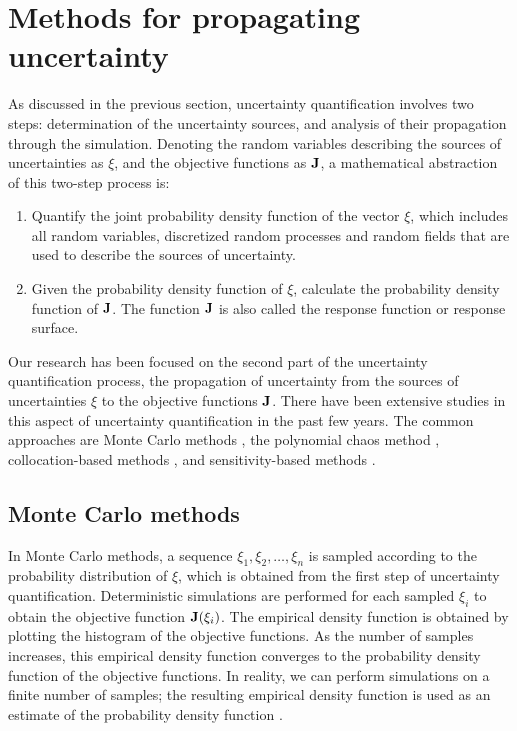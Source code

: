 \section{Methods for propagating uncertainty}

As discussed in the previous section, uncertainty quantification
involves two steps: determination of the uncertainty sources, and
analysis of their propagation through the simulation.
Denoting the random variables describing the sources of uncertainties as $\xi$,
and the objective functions as $\bf J$,
a mathematical abstraction of this two-step process is:
\begin{enumerate}
\item Quantify the joint probability density function of the vector $\xi$,
which
includes all random variables, discretized random processes and random fields
that are used to describe the sources of uncertainty.
\item Given the probability density function of $\xi$, calculate the
probability density function of $\bf J$.
The function $\bf J$ is also called the response function or response surface.
\end{enumerate}

Our research has been focused on the second part of the uncertainty
quantification process,
the propagation of uncertainty from the sources of uncertainties $\xi$ to the
objective functions
${\bf J}$.  There have been extensive studies in this aspect of uncertainty
quantification in the past few years.  The common approaches are
Monte Carlo methods \cite[]{mars_entry}, the polynomial chaos method
\cite[]{poly_chaos}, collocation-based methods \cite[]{collocation}, and
sensitivity-based methods \cite[]{sensitivity1}.

\subsection{Monte Carlo methods}
In Monte Carlo methods, a sequence
$\xi_1, \xi_2, \ldots, \xi_n$ is sampled according to the probability
distribution of $\xi$, which is obtained from the first step of uncertainty
quantification.  Deterministic simulations are performed for each sampled
$\xi_i$ to obtain the objective function ${\bf J}(\xi_i)$.
The empirical density function is obtained by plotting the histogram
of the objective functions.
As the number of samples increases, this empirical density function
converges to the probability density function of the objective functions.
In reality, we can perform simulations on a finite number of
samples; the resulting empirical density function is used as an estimate
of the probability density function \cite[]{monte1}.

